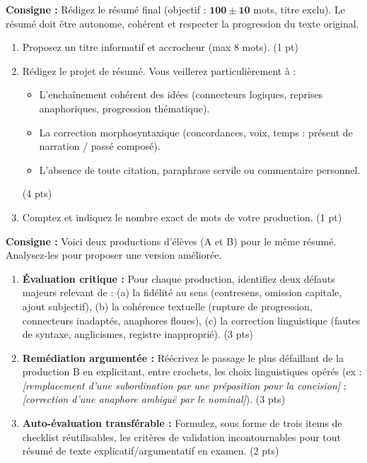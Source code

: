 \documentclass[11pt]{article}
\begin{document}
\begin{exercice}
\textbf{Consigne :} Rédigez le résumé final (objectif : $\mathbf{100 \pm 10}$ mots, titre exclu). Le résumé doit être autonome, cohérent et respecter la progression du texte original.
\begin{enumerate}
    \item Proposez un titre informatif et accrocheur (max 8 mots). (1 pt)
    \item Rédigez le projet de résumé. Vous veillerez particulièrement à :
    \begin{itemize}
        \item L'enchaînement cohérent des idées (connecteurs logiques, reprises anaphoriques, progression thématique).
        \item La correction morphosyntaxique (concordances, voix, temps : présent de narration / passé composé).
        \item L'absence de toute citation, paraphrase servile ou commentaire personnel.
    \end{itemize}
    (4 pts)
    \item Comptez et indiquez le nombre exact de mots de votre production. (1 pt)
\end{enumerate}
\end{exercice}

\begin{exercice}
\textbf{Consigne :} Voici deux productions d'élèves (A et B) pour le même résumé. Analysez-les pour proposer une version améliorée.
\begin{enumerate}
    \item \textbf{Évaluation critique :} Pour chaque production, identifiez deux défauts majeurs relevant de : (a) la fidélité au sens (contresens, omission capitale, ajout subjectif), (b) la cohérence textuelle (rupture de progression, connecteurs inadaptés, anaphores floues), (c) la correction linguistique (fautes de syntaxe, anglicismes, registre inapproprié). (3 pts)
    \item \textbf{Remédiation argumentée :} Réécrivez le passage le plus défaillant de la production B en explicitant, entre crochets, les choix linguistiques opérés (ex : \textit{[remplacement d'une subordination par une préposition pour la concision]} ; \textit{[correction d'une anaphore ambiguë par le nominal]}). (3 pts)
    \item \textbf{Auto-évaluation transférable :} Formulez, sous forme de trois items de checklist réutilisables, les critères de validation incontournables pour tout résumé de texte explicatif/argumentatif en examen. (2 pts)
\end{enumerate}
\end{exercice}
\end{document}
